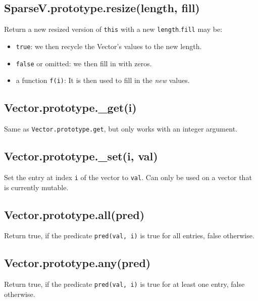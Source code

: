 \documentclass{article}
\begin{document}
    \subsection*{SparseV.prototype.resize(length, fill)}
    Return a new resized version of \texttt{this} with a new \texttt{length}.\texttt{fill} may be:


\begin{itemize}

\item \texttt{true}: we then recycle the Vector's values to the new length.

\item \texttt{false} or omitted: we then fill in with zeros.

\item a function \texttt{f(i)}: It is then used to fill in the \emph{new} values.

\end{itemize}

    \subsection*{Vector.prototype.\_get(i)}
    Same as \texttt{Vector.prototype.get}, but only works with an integer argument.


    \subsection*{Vector.prototype.\_set(i, val)}
    Set the entry at index \texttt{i} of the vector to \texttt{val}. Can only be used on a vector
that is currently mutable.


    \subsection*{Vector.prototype.all(pred)}
    Return true, if the predicate \texttt{pred(val, i)} is true for all entries, false otherwise.


    \subsection*{Vector.prototype.any(pred)}
    Return true, if the predicate \texttt{pred(val, i)} is true for at least one entry, false otherwise.
\end{document}
